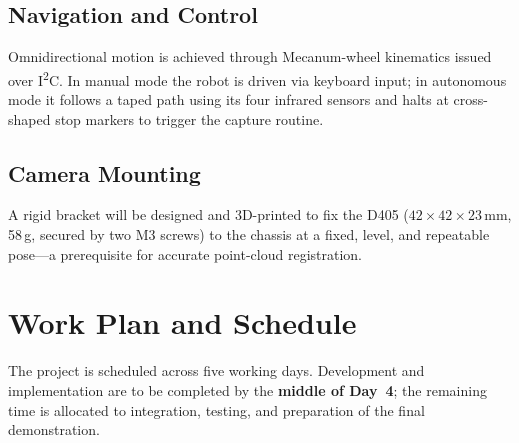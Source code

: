 \documentclass[11pt,a4paper]{article}
\begin{document}
\subsection{Navigation and Control}
Omnidirectional motion is achieved through Mecanum-wheel kinematics issued over I\textsuperscript{2}C.
In manual mode the robot is driven via keyboard input; in autonomous mode it follows a taped path
using its four infrared sensors and halts at cross-shaped stop markers to trigger the capture routine.

\subsection{Camera Mounting}
A rigid bracket will be designed and 3D-printed to fix the D405 ($42 \times 42 \times 23$\,mm, 58\,g,
secured by two M3 screws) to the chassis at a fixed, level, and repeatable pose---a prerequisite for
accurate point-cloud registration.

\section{Work Plan and Schedule}
The project is scheduled across five working days. Development and implementation are to be completed
by the \textbf{middle of Day~4}; the remaining time is allocated to integration, testing, and
preparation of the final demonstration.
\end{document}
